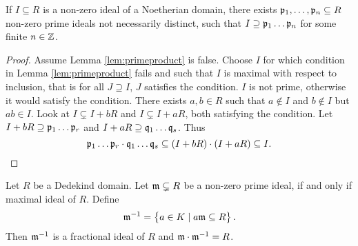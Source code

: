 \begin{lemma}
\label{lem:primeproduct}
If $ I \subseteq R $ is a non-zero ideal of a Noetherian domain, there exists $ \mathfrak{p}_1, \dots, \mathfrak{p}_n \subseteq R $ non-zero prime ideals not necessarily distinct, such that $ I \supseteq \mathfrak{p}_1 \dots \mathfrak{p}_n $ for some finite $ n \in \mathbb{Z} $.
\end{lemma}

\pagebreak

\begin{proof}
Assume Lemma \ref{lem:primeproduct} is false. Choose $ I $ for which condition in Lemma \ref{lem:primeproduct} fails and such that $ I $ is maximal with respect to inclusion, that is for all $ J \supseteq I $, $ J $ satisfies the condition. $ I $ is not prime, otherwise it would satisfy the condition. There exists $ a, b \in R $ such that $ a \notin I $ and $ b \notin I $ but $ ab \in I $. Look at $ I \subsetneq I + bR $ and $ I \subsetneq I + aR $, both satisfying the condition. Let $ I + bR \supseteq \mathfrak{p}_1 \dots \mathfrak{p}_r $ and $ I + aR \supseteq \mathfrak{q}_1 \dots \mathfrak{q}_s $.
Thus
$$ \pp_1 \dots \pp_r \cdot \qq_1 \dots \qq_s \subseteq \br{I + bR} \cdot \br{I + aR} \subseteq I. $$
\end{proof}

\begin{proposition}
\label{prop:inverse}
Let $ R $ be a Dedekind domain. Let $ \mathfrak{m} \subsetneq R $ be a non-zero prime ideal, if and only if maximal ideal of $ R $. Define
$$ \mm^{-1} = \cbr{a \in K \mid a\mm \subseteq R}. $$
Then $ \mathfrak{m}^{-1} $ is a fractional ideal of $ R $ and $ \mathfrak{m} \cdot \mathfrak{m}^{-1} = R $.
\end{proposition}


